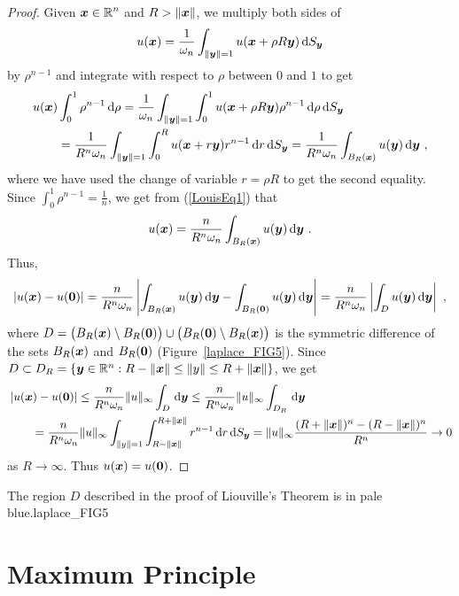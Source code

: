 \begin{proof}
Given $\displaystyle {\bm{x}} \in \mathbb{R}^n$ and $R>\|{\bm{x}}\|$, we
multiply both sides of
\[
u({\bm{x}}) = \frac{1}{\omega_n} \int_{\|{\bm{y}}\|=1}
u({\bm{x}} + \rho R {\bm{y}}) \,\mathrm{d}{S_{{\bm{y}}}}
\]
by $\displaystyle \rho^{n-1}$ and integrate with respect to $\rho$
between $0$ and $1$ to get
\begin{align}
&u({\bm{x}})\int_0^1 \rho^{n-1} \,\mathrm{d}{\rho} =
\frac{1}{\omega_n} \int_{\|{\bm{y}}\|=1} \int_0^1
u({\bm{x}} + \rho R {\bm{y}}) \rho^{n-1} \,\mathrm{d}{\rho} \,\mathrm{d}{S_{{\bm{y}}}}
\nonumber \\
&\qquad = \frac{1}{R^n \omega_n} \int_{\|{\bm{y}}\|=1} \int_0^R
u({\bm{x}} + r {\bm{y}}) r^{n-1} \,\mathrm{d}{r} \,\mathrm{d}{S_{{\bm{y}}}}
= \frac{1}{R^n \omega_n} \int_{B_R({\bm{x}})} u({\bm{y}}) \,\mathrm{d}{{\bm{y}}}
\ , \label{LouisEq1}
\end{align}
where we have used the change of variable $r=\rho R$ to get the second
equality.
Since
$\displaystyle \int_0^1 \rho^{n-1} = \frac{1}{n}$, we get from
(\ref{LouisEq1}) that
\[
u({\bm{x}}) = \frac{n}{R^n \omega_n} \int_{B_R({\bm{x}})} u({\bm{y}})
\,\mathrm{d}{{\bm{y}}} \ .
\]
Thus,
\[
\left| u({\bm{x}}) - u({\bm{0}}) \right|
= \frac{n}{R^n \omega_n} \left| 
\int_{B_R({\bm{x}})} u({\bm{y}}) \,\mathrm{d}{{\bm{y}}}
- \int_{B_R({\bm{0}})} u({\bm{y}}) \,\mathrm{d}{{\bm{y}}} \right|
= \frac{n}{R^n \omega_n} \left| 
\int_D u({\bm{y}}) \,\mathrm{d}{{\bm{y}}} \right| \ ,
\]
where $D = \big(B_R({\bm{x}}) \setminus B_R({\bm{0}})\big) \cup 
\big(B_R({\bm{0}}) \setminus B_R({\bm{x}})\big)$ is the symmetric difference
of the sets $B_R({\bm{x}})$ and $B_R({\bm{0}})$ (Figure~\ref{laplace_FIG5}).
Since
$D \subset D_R = \{ {\bm{y}} \in \mathbb{R}^n :
R-\|{\bm{x}}\| \leq \|y\| \leq R+\|{\bm{x}}\|\}$,
we get
\begin{align*}
&\left| u({\bm{x}}) - u({\bm{0}}) \right|
\leq \frac{n}{R^n \omega_n} \|u\|_{\infty} \int_D \,\mathrm{d}{{\bm{y}}}
\leq \frac{n}{R^n \omega_n} \|u\|_{\infty} \int_{D_R} \,\mathrm{d}{{\bm{y}}} \\
&\qquad = \frac{n}{R^n \omega_n} \|u\|_{\infty} \int_{\|y\|=1}
\int_{R-\|{\bm{x}}\|}^{R+\|{\bm{x}}\|} r^{n-1} \,\mathrm{d}{r} \,\mathrm{d}{S_{{\bm{y}}}}
= \|u\|_{\infty} \frac{ (R+\|{\bm{x}}\|)^n - (R-\|{\bm{x}}\|)^n}{R^n}
\to 0 
\end{align*}
as $R \to \infty$.  Thus $u({\bm{x}}) = u({\bm{0}})$.
\end{proof}

{The region $D$ described in the proof of Liouville's Theorem is
in pale blue.}{laplace_FIG5}

\section{Maximum Principle} \label{SectLaplaceMaxPrinc}

